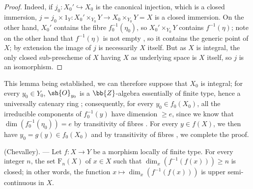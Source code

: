 \begin{proof}
Indeed, if $j_0:X_0'\hookrightarrow X_0$ is the canonical injection, which is a closed immersion, $j=j_0\times 1_Y:X_0'\times_{Y_0}Y\to X_0\times_{Y_0}Y=X$ is a closed immersion.
On the other hand, $X_0'$ contains the fibre $f_0^{-1}(\eta_0)$, so $X_0'\times_{Y_0}Y$ contains $f^{-1}(\eta)$; note on the other hand that $f^{-1}(\eta)$ is not empty , so it contains the generic point of $X$; by extension the image of $j$ is necessarily $X$ itself.
But as $X$ is integral, the only closed sub-prescheme of $X$ having $X$ as underlying space is $X$ itself, so $j$ is an isomorphism.
\end{proof}

This lemma being established, we can therefore suppose that $X_0$ is integral; for every $y_0\in Y_0$, $\sh{O}_{y_0}$ is a $\bb{Z}$-algebra essentially of finite type, hence a universally
catenary ring ; consequently, for every $y_0\in f_0(X_0)$, all the irreducible components of $f_0^{-1}(y)$ have dimension $\geq e$, since we know that $\dim(f_0^{-1}(\eta_0))=e$ by transitivity of fibres .
For every $y\in f(X)$, we then have $y_0=g(y)\in f_0(X_0)$ and by transitivity of fibres , we complete the proof.

\begin{theorem}[13.1.3]
\label{IV.13.1.3}
\textnormal{(Chevalley).} ---
Let $f:X\to Y$ be a morphism locally of finite type.
For every integer $n$, the set $\mathrm{F}_n(X)$ of $x\in X$ such that $\dim_x(f^{-1}(f(x)))\geq n$ is closed; in other words, the function $x\mapsto\dim_x(f^{-1}(f(x)))$ is upper semi-continuous in $X$.
\end{theorem}

